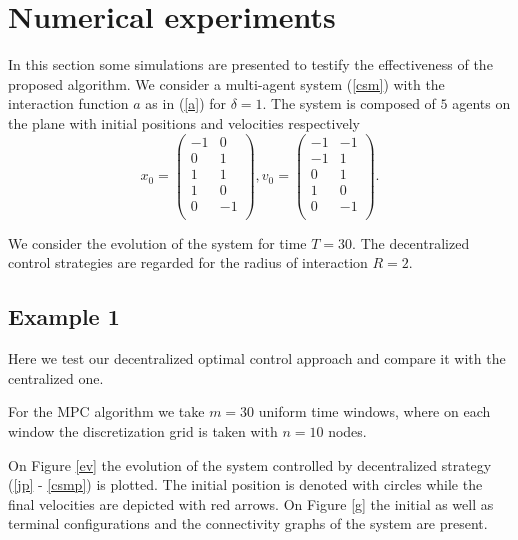 \documentclass[a4paper,10pt, english]{article}
\begin{document}
 \section{Numerical experiments}
In this section some simulations are presented to testify the effectiveness of the proposed algorithm. We consider a multi-agent system (\ref{csm}) with the interaction function 
$a$ as in (\ref{a}) for $\delta = 1$. The system is composed of $5$
agents on the plane with initial positions and velocities respectively
\[x_0 =  \left( \begin{array}{cc}
		  -1  &   0\\
           0  &   1\\
           1  &   1\\
           1  &   0\\
           0 &   -1\\
\end{array} \right),
%
v_0 = 
\left( \begin{array}{cc}
	     -1&  -1\\
	     -1&   1\\
	      0&   1\\
	      1&   0\\
	      0&  -1\\
\end{array} \right).
\]

We consider the evolution of the system for time $T = 30$. The decentralized control strategies are regarded for the radius of interaction $R = 2$.  
 \subsection{Example 1}
Here we test our decentralized optimal control approach and compare it with the centralized one. 
 
For the MPC algorithm we take  $m = 30$ uniform time windows, where  on each window the discretization grid
is taken with $n = 10$ nodes.  


On Figure \ref{ev} the evolution of the system  controlled by decentralized strategy (\ref{jp} - \ref{csmp}) is plotted. The initial position
is denoted with circles while the final velocities are depicted with red arrows. On Figure \ref{g} the initial as well as terminal configurations and the connectivity graphs of the system are present.
\end{document}
